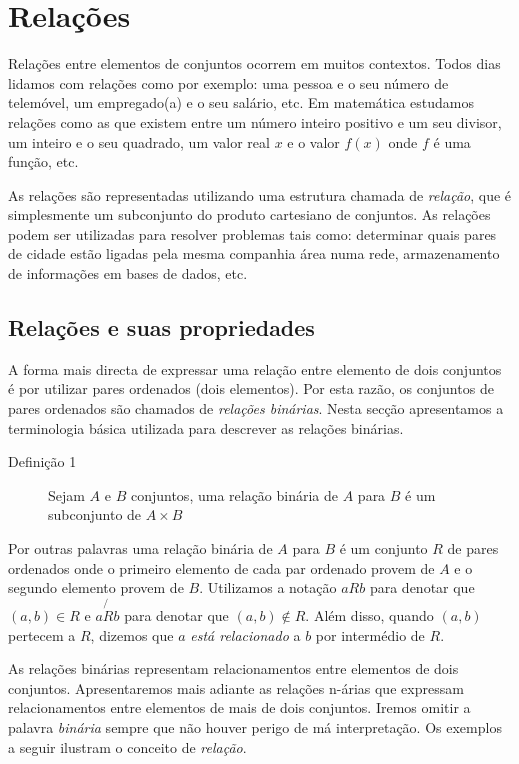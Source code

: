\chapter{Relações}

Relações entre elementos de conjuntos ocorrem em muitos contextos. Todos dias lidamos com relações como por 
exemplo: uma pessoa e o seu número de telemóvel, um empregado(a) e o seu salário, etc. Em matemática estudamos
relações como as que existem entre um número inteiro positivo e um seu divisor, um inteiro e o seu quadrado, um 
valor real $x$ e o valor $f(x)$ onde $f$ é uma função, etc.

As relações são representadas utilizando uma estrutura chamada de \emph{relação}, que é simplesmente um subconjunto
do produto cartesiano de conjuntos. As relações podem ser utilizadas para resolver problemas tais como: determinar quais
pares de cidade estão ligadas pela mesma companhia área numa rede, armazenamento de informações em bases de dados, etc.

\section{Relações e suas propriedades}


A forma mais directa de expressar uma relação entre elemento de dois conjuntos é por utilizar pares ordenados (dois elementos).
Por esta razão, os conjuntos de pares ordenados são chamados de \emph{relações binárias}. Nesta secção apresentamos
a terminologia básica utilizada para descrever as relações binárias.

\begin{description}
	\item[Definição 1] Sejam $A$ e $B$ conjuntos, uma relação binária de $A$ para $B$ é um subconjunto de $A \times B$
\end{description}

Por outras palavras uma relação binária de $A$ para $B$ é um conjunto $R$ de pares ordenados onde o primeiro elemento
de cada par ordenado provem de $A$ e o segundo elemento provem de $B$. Utilizamos a notação $a R b$ para denotar 
que $(a,b) \in R$ e $a \not{R} b$ para denotar que $(a,b) \notin R$. Além disso, quando $(a,b)$ pertecem a $R$, dizemos
que $a$ \emph{está relacionado} a $b$ por intermédio de $R$.

As relações binárias representam relacionamentos entre elementos de dois conjuntos. Apresentaremos mais adiante 
as relações n-árias que expressam relacionamentos entre elementos de mais de dois conjuntos. Iremos omitir a palavra
\emph{binária} sempre que não houver perigo de má interpretação. Os exemplos a seguir ilustram o conceito de \emph{relação}.

